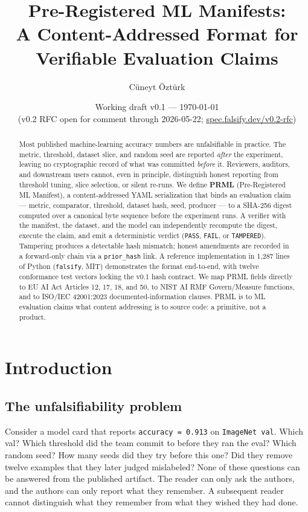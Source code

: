 \documentclass[11pt, a4paper]{article}
\title{\bfseries Pre-Registered ML Manifests:\\
A Content-Addressed Format for Verifiable Evaluation Claims}
\author[1]{C\"uneyt \"Ozt\"urk}
\affil[1]{Independent. Correspondence: \href{mailto:hello@falsify.dev}{hello@falsify.dev}\\
Spec: \href{https://spec.falsify.dev/v0.1}{spec.falsify.dev/v0.1} \quad
Code: \href{https://github.com/studio-11-co/falsify}{github.com/studio-11-co/falsify} \quad
DOI: \href{https://doi.org/10.5281/zenodo.20177839}{10.5281/zenodo.20177839}}
\date{Working draft v0.1 --- \today\\ {\small (v0.2 RFC open for comment through 2026-05-22; \href{https://spec.falsify.dev/v0.2-rfc}{spec.falsify.dev/v0.2-rfc})}}
\begin{document}
\maketitle

\begin{abstract}
\noindent
Most published machine-learning accuracy numbers are unfalsifiable in practice. The metric, threshold, dataset slice, and random seed are reported \emph{after} the experiment, leaving no cryptographic record of what was committed \emph{before} it. Reviewers, auditors, and downstream users cannot, even in principle, distinguish honest reporting from threshold tuning, slice selection, or silent re-runs. We define \textbf{PRML} (Pre-Registered ML Manifest), a content-addressed YAML serialization that binds an evaluation claim --- metric, comparator, threshold, dataset hash, seed, producer --- to a SHA-256 digest computed over a canonical byte sequence before the experiment runs. A verifier with the manifest, the dataset, and the model can independently recompute the digest, execute the claim, and emit a deterministic verdict (\texttt{PASS}, \texttt{FAIL}, or \texttt{TAMPERED}). Tampering produces a detectable hash mismatch; honest amendments are recorded in a forward-only chain via a \texttt{prior\_hash} link. A reference implementation in 1{,}287 lines of Python (\texttt{falsify}, MIT) demonstrates the format end-to-end, with twelve conformance test vectors locking the v0.1 hash contract. We map PRML fields directly to EU AI Act Articles 12, 17, 18, and 50, to NIST AI RMF Govern/Measure functions, and to ISO/IEC 42001:2023 documented-information clauses. PRML is to ML evaluation claims what content addressing is to source code: a primitive, not a product.
\end{abstract}

\section{Introduction}
\label{sec:intro}

\subsection{The unfalsifiability problem}

Consider a model card that reports \texttt{accuracy = 0.913} on \texttt{ImageNet val}. Which val? Which threshold did the team commit to before they ran the eval? Which random seed? How many seeds did they try before this one? Did they remove twelve examples that they later judged mislabeled? None of these questions can be answered from the published artifact. The reader can only ask the authors, and the authors can only report what they remember. A subsequent reader cannot distinguish what they remember from what they wished they had done.
\end{document}
